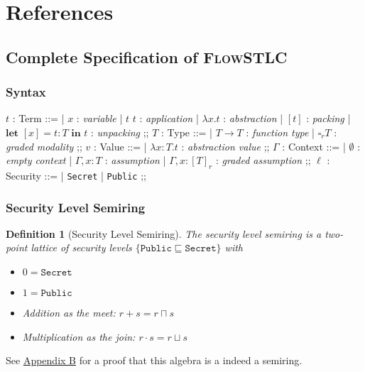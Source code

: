 \documentclass[conference]{IEEEtran}
\newcommand\lam[2]{\lambda #1.#2}
\newcommand\unp[3]{\textbf{let }[#1]=#2\textbf{ in }#3}
\newcommand\gradedt[2]{\square_#1 #2}
\newcommand\public{\texttt{Public}}
\newcommand\secret{\texttt{Secret}}
\newtheorem{definition}{Definition}
\begin{document}
\section*{References}

\appendix

\subsection{Complete Specification of \textsc{FlowSTLC}}
\subsubsection{Syntax}
\begin{center}
	\begin{bnf}
		$t$ : \textsf{Term} ::=
		| $x$ : \textit{variable}
		| $t$ $t$ : \textit{application}
		| $\lam{x}{t}$ : \textit{abstraction}
		| $[t]$ : \textit{packing}
		| $\unp{x}{t\colon T}{t}$ : \textit{unpacking}
		;;
		$T$ : \textsf{Type} ::=
		| $T\to T$ : \textit{function type}
		| $\gradedt{r}{T}$ : \textit{graded modality}
		;;
		$v$ : \textsf{Value} ::=
		| $\lam{x\colon T}{t}$ : \textit{abstraction value}
		;;
		$\Gamma$ : \textsf{Context} ::=
		| $\emptyset$ : \textit{empty context}
        | $\Gamma,x\colon T$ : \textit{assumption}
		| $\Gamma,x\colon[T]_r$ : \textit{graded assumption}
		;;
		$\ell$ : \textsf{Security} ::=
		| \texttt{Secret}
		| \texttt{Public}
		;;
	\end{bnf}
\end{center}

\subsubsection{Security Level Semiring}

\begin{definition}[Security Level Semiring]
The security level semiring is a two-point lattice of security levels $\{\public\sqsubseteq\secret\}$ with 
\begin{itemize}
	\item $0=\secret$
	\item $1=\public$
	\item Addition as the meet: $r+s=r\sqcap s$
	\item Multiplication as the join: $r\cdot s=r\sqcup s$
\end{itemize}
\end{definition}
See \hyperref[app-b]{Appendix B} for a proof that this algebra is a indeed a semiring.
\end{document}
